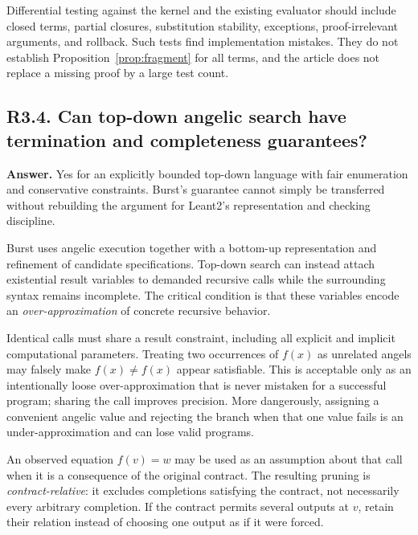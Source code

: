 \documentclass[11pt,a4paper]{article}
\newcommand{\question}[2]{\subsection{#1. #2}\label{q:#1}}
\theoremstyle{definition}
\theoremstyle{remark}
\begin{document}
Differential testing against the kernel and the existing evaluator should include closed terms, partial closures, substitution stability, exceptions, proof-irrelevant arguments, and rollback. Such tests find implementation mistakes. They do not establish Proposition~\ref{prop:fragment} for all terms, and the article does not replace a missing proof by a large test count.

\question{R3.4}{Can top-down angelic search have termination and completeness guarantees?}

\textbf{Answer.} Yes for an explicitly bounded top-down language with fair enumeration and conservative constraints. Burst's guarantee cannot simply be transferred without rebuilding the argument for Leant2's representation and checking discipline.

Burst uses angelic execution together with a bottom-up representation and refinement of candidate specifications.\cite{burst} Top-down search can instead attach existential result variables to demanded recursive calls while the surrounding syntax remains incomplete. The critical condition is that these variables encode an \emph{over-approximation} of concrete recursive behavior.

Identical calls must share a result constraint, including all explicit and implicit computational parameters. Treating two occurrences of $f(x)$ as unrelated angels may falsely make $f(x)\ne f(x)$ appear satisfiable. This is acceptable only as an intentionally loose over-approximation that is never mistaken for a successful program; sharing the call improves precision. More dangerously, assigning a convenient angelic value and rejecting the branch when that one value fails is an under-approximation and can lose valid programs.

An observed equation $f(v)=w$ may be used as an assumption about that call when it is a consequence of the original contract. The resulting pruning is \emph{contract-relative}: it excludes completions satisfying the contract, not necessarily every arbitrary completion. If the contract permits several outputs at $v$, retain their relation instead of choosing one output as if it were forced.
\end{document}
